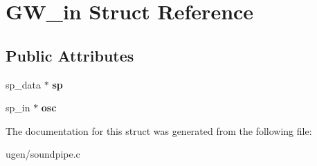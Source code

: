 \hypertarget{structGW__in}{}\section{G\+W\+\_\+in Struct Reference}
\label{structGW__in}
\subsection*{Public Attributes}
\begin{DoxyCompactItemize}
\item 
\hypertarget{structGW__in_a7442e5c3478d2c7534efcd0fdf4c21bf}{}\label{structGW__in_a7442e5c3478d2c7534efcd0fdf4c21bf} 
sp\+\_\+data $\ast$ {\bfseries sp}
\item 
\hypertarget{structGW__in_ab385198bd52878f9d745a593b26f7ad6}{}\label{structGW__in_ab385198bd52878f9d745a593b26f7ad6} 
sp\+\_\+in $\ast$ {\bfseries osc}
\end{DoxyCompactItemize}


The documentation for this struct was generated from the following file\+:\begin{DoxyCompactItemize}
\item 
ugen/soundpipe.\+c\end{DoxyCompactItemize}
